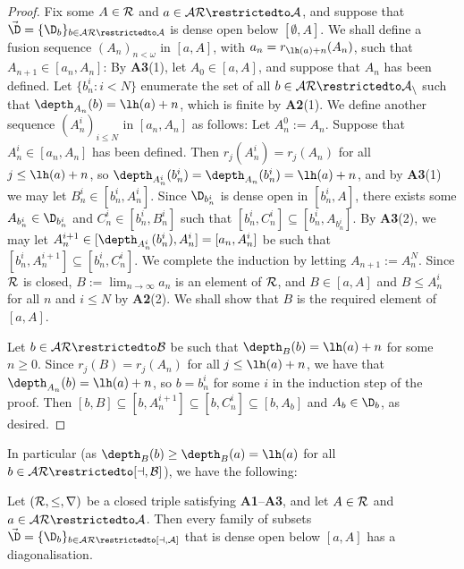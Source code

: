 \documentclass[11pt,reqno]{amsart}
\begin{document}
\begin{proof}
    Fix some $A \in \cal{R}$ and $a \in \cal{AR}\restrictedto A$, and suppose that $\vec{\D} = \{\D_b\}_{b\in\cal{AR}\restrictedto A}$ is dense open below $[\emptyset,A]$. We shall define a fusion sequence $(A_n)_{n<\omega}$ in $[a,A]$, with $a_n = r_{\lh(a)+n}(A_n)$, such that $A_{n+1} \in [a_n,A_n]$: By \textbf{A3}(1), let $A_0 \in [a,A]$, and suppose that $A_n$ has been defined. Let $\{b_n^i : i < N\}$ enumerate the set of all $b \in \cal{AR}\restrictedto A_n$ such that $\depth_{A_n}(b) = \lh(a) + n$, which is finite by \textbf{A2}(1). We define another sequence $(A_n^i)_{i \leq N}$ in $[a_n,A_n]$ as follows: Let $A_n^0 := A_n$. Suppose that $A_n^i \in [a_n,A_n]$ has been defined. Then $r_j(A_n^i) = r_j(A_n)$ for all $j \leq \lh(a)+n$, so $\depth_{A_n^i}(b_n^i) = \depth_{A_n}(b_n^i) = \lh(a)+n$, and by \textbf{A3}(1) we may let $B_n^i \in [b_n^i,A_n^i]$. Since $\D_{b_n^i}$ is dense open in $[b_n^i,A]$, there exists some $A_{b_n^i} \in \D_{b_n^i}$ and $C_n^i \in [b_n^i,B_n^i]$ such that $[b_n^i,C_n^i] \subseteq [b_n^i,A_{b_n^i}]$. By \textbf{A3}(2), we may let $A_n^{i+1} \in [\depth_{A_n^i}(b_n^i),A_n^i] = [a_n,A_n^i]$ be such that $[b_n^i,A_n^{i+1}] \subseteq [b_n^i,C_n^i]$. We complete the induction by letting $A_{n+1} := A_n^N$. Since $\cal{R}$ is closed, $B := \lim_{n\to\infty} a_n$ is an element of $\cal{R}$, and $B \in [a,A]$ and $B \leq A_n^i$ for all $n$ and $i \leq N$ by \textbf{A2}(2). We shall show that $B$ is the required element of $[a,A]$.

    Let $b \in \cal{AR}\restrictedto B$ be such that $\depth_B(b) = \lh(a) + n$ for some $n \geq 0$. Since $r_j(B) = r_j(A_n)$ for all $j \leq \lh(a)+n$, we have that $\depth_{A_n}(b) = \lh(a)+n$, so $b = b_n^i$ for some $i$ in the induction step of the proof. Then $[b,B] \subseteq [b,A_n^{i+1}] \subseteq [b,C_n^i] \subseteq [b,A_b]$ and $A_b \in \D_b$, as desired.
\end{proof}

In particular (as $\depth_B(b) \geq \depth_B(a) = \lh(a)$ for all $b \in \cal{AR}\restrictedto[a,B]$), we have the following:

\begin{lemma}[{\cite[Lemma 3.16]{Y24}}]
\label{lem:R.is.semiselective}
    Let $(\cal{R},\leq,r)$ be a closed triple satisfying \textbf{A1}--\textbf{A3}, and let $A \in \cal{R}$ and $a \in \cal{AR}\restrictedto A$. Then every family of subsets $\vec{\D} = \{\D_b\}_{b \in \cal{AR}\restrictedto[a,A]}$ that is dense open below $[a,A]$ has a diagonalisation.
\end{lemma}
\end{document}
